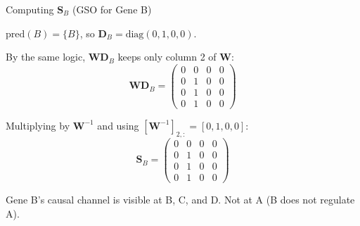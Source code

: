 \begin{examplebox}{Computing $\mathbf{S}_B$ (GSO for Gene B)}

$\text{pred}(B) = \{B\}$, so $\mathbf{D}_B = \text{diag}(0, 1, 0, 0)$.

By the same logic, $\mathbf{W}\mathbf{D}_B$ keeps only column 2 of $\mathbf{W}$:
\[
    \mathbf{W}\mathbf{D}_B = \begin{pmatrix}0&0&0&0\\0&1&0&0\\0&1&0&0\\0&1&0&0\end{pmatrix}
\]

Multiplying by $\mathbf{W}^{-1}$ and using $[\mathbf{W}^{-1}]_{2,:} = [0,1,0,0]$:
\[
    \mathbf{S}_B = \begin{pmatrix}0&0&0&0\\0&1&0&0\\0&1&0&0\\0&1&0&0\end{pmatrix}
\]

Gene B's causal channel is visible at B, C, and D. Not at A (B does not
regulate A).
\end{examplebox}

